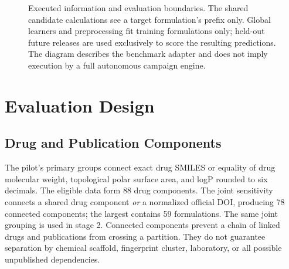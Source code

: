 \documentclass[conference,letterpaper]{IEEEtran}
\begin{document}
\begin{figure}[t]
\centering
{}
\caption{Executed information and evaluation boundaries. The shared candidate calculations see a target formulation's prefix only. Global learners and preprocessing fit training formulations only; held-out future releases are used exclusively to score the resulting predictions. The diagram describes the benchmark adapter and does not imply execution by a full autonomous campaign engine.}
\label{fig:boundary}
\end{figure}

\section{Evaluation Design}
\subsection{Drug and Publication Components}
The pilot's primary groups connect exact drug SMILES or equality of drug molecular weight, topological polar surface area, and logP rounded to six decimals. The eligible data form 88 drug components. The joint sensitivity connects a shared drug component \emph{or} a normalized official DOI, producing 78 connected components; the largest contains 59 formulations. The same joint grouping is used in stage 2. Connected components prevent a chain of linked drugs and publications from crossing a partition. They do not guarantee separation by chemical scaffold, fingerprint cluster, laboratory, or all possible unpublished dependencies.
\end{document}
